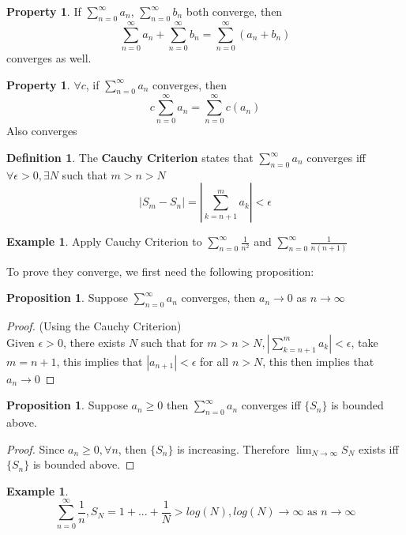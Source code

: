 \documentclass[12pt]{article}
\theoremstyle{plain}
\theoremstyle{definition}
\newtheorem{definition}[theorem]{Definition}
\newtheorem{example}[theorem]{Example}
\newtheorem{proposition}[theorem]{Proposition}
\newtheorem{property}[theorem]{Property}
\begin{document}
\begin{property}
	If $\sum^\infty_{n=0} a_n$, $\sum^\infty_{n=0} b_n$ both converge, then
	$$\sum^\infty_{n=0} a_n + \sum^\infty_{n=0} b_n = \sum^\infty_{n=0} (a_n + b_n)$$
	converges as well.
\end{property}

\begin{property}
	$\forall c$, if $\sum^\infty_{n=0} a_n$ converges, then
	$$c\sum^\infty_{n=0} a_n = \sum^\infty_{n=0} c(a_n)$$
	Also converges
\end{property}

\begin{definition}
	The \textbf{Cauchy Criterion} states that $\sum^\infty_{n=0} a_n$ converges iff $\forall \epsilon > 0, \exists N$ such that $m>n > N$
	$$|S_m - S_n|=|\sum^m_{k=n+1} a_k|<\epsilon$$
\end{definition}

\begin{example}
	Apply Cauchy Criterion to $\sum^\infty_{n=0} \frac{1}{n^2}$ and $\sum^\infty_{n=0} \frac{1}{n(n+1)}$
\end{example}

To prove they converge, we first need the following proposition:

\begin{proposition}
	Suppose $\sum^\infty_{n=0} a_n$ converges, then $a_n \to 0$ as $n\to\infty$
\end{proposition}

\begin{proof} (Using the Cauchy Criterion)\\
Given $\epsilon > 0$, there exists $N$ such that for $m > n > N, |\sum^m_{k=n+1} a_k|<\epsilon$, take $m=n+1$, this implies that $|a_{n+1}|<\epsilon$ for all $n > N$, this then implies that $a_n \to 0$
\end{proof}

\begin{proposition}
	Suppose $a_n \geq 0$ then $\sum^\infty_{n=0} a_n$ converges iff $\{ S_n \}$ is bounded above.
\end{proposition}

\begin{proof}
	Since $a_n \geq 0, \forall n$, then $\{ S_n \}$ is increasing. Therefore $\lim_{N\to\infty} S_N$ exists iff $\{ S_n \}$ is bounded above.
\end{proof}

\begin{example}
	$$\sum^\infty_{n=0} \frac{1}{n}, S_N = 1 +... + \frac{1}{N} > log(N), log(N)\to\infty \text{ as } n\to\infty$$
\end{example}
\end{document}
